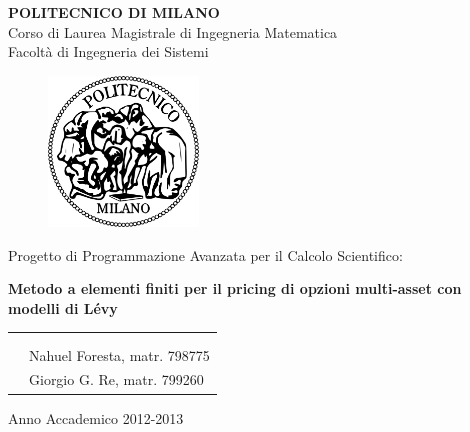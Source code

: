 \documentclass[a4paper,10pt]{report}
\theoremstyle{plain}
\theoremstyle{definition}
\theoremstyle{remark}
\begin{document}
\thispagestyle{empty}

	\begin{center}
	 {\large{\textbf{POLITECNICO DI MILANO}\\
             Corso di Laurea Magistrale di Ingegneria Matematica\\
             Facolt\`a di Ingegneria dei Sistemi\\
             }}
	\end{center}

	\vspace{1cm}
	\begin{figure}[htbp]
	\begin{center}
	\includegraphics[width=4cm]{img/poli_logo.png}
	\end{center}
	\end{figure}
	
	\vspace{1cm}
	\begin{center}
	{\LARGE{Progetto di Programmazione Avanzata per il Calcolo Scientifico:}}
	\end{center}
	\vspace{2cm}
	\begin{center}
	{\LARGE{\textbf{Metodo a elementi finiti per il pricing di opzioni multi-asset con modelli di L\'evy}}}
	\end{center}
	
	\begin{table}[hb!]
	\begin{center}
	\begin{tabular}{p{8cm}p{7cm}}
	& \\
  	& \\
  	& {\large Nahuel Foresta, matr. 798775}\\
	& {\large Giorgio G. Re, matr. 799260}\\
	\end{tabular}
	\end{center}
	\end{table}
	\begin{center}
	\vspace{3cm}
	\large{Anno Accademico 2012-2013}
	\end{center}
\end{document}
